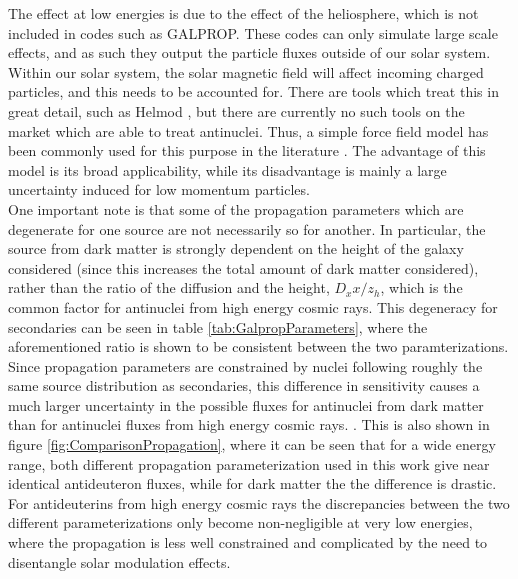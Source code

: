 The effect at low energies is due to the effect of the heliosphere, which is not included in codes such as GALPROP. These codes can only simulate large scale effects, and as such they output the particle fluxes outside of our solar system. Within our solar system, the solar magnetic field will affect incoming charged particles, and this needs to be accounted for. There are tools which treat this in great detail, such as Helmod \cite{}, but there are currently no such tools on the market which are able to treat antinuclei. Thus, a simple force field model has been commonly used for this purpose in the literature \cite{}. The advantage of this model is its broad applicability, while its disadvantage is mainly a large uncertainty induced for low momentum particles\cite{}. \\

One important note is that some of the propagation parameters which are degenerate for one source are not necessarily so for another. In particular, the source from dark matter is strongly dependent on the height of the galaxy considered (since this increases the total amount of dark matter considered), rather than the ratio of the diffusion and the height, $D_xx/z_h$, which is the common factor for antinuclei from high energy cosmic rays. This degeneracy for secondaries can be seen in table \ref{tab:GalpropParameters}, where the aforementioned  ratio is shown to be consistent between the two paramterizations. Since propagation parameters are constrained by nuclei following roughly the same source distribution as secondaries, this difference in sensitivity causes a much larger uncertainty in the possible fluxes for antinuclei from dark matter than for antinuclei fluxes from high energy cosmic rays. \cite{}. This is also shown in figure \ref{fig:ComparisonPropagation}, where it can be seen that for a wide energy range, both different propagation parameterization used in this work give near identical antideuteron fluxes, while for dark matter the the difference is drastic. For antideuterins from high energy cosmic rays the discrepancies between the two different parameterizations only become non-negligible at very low energies, where the propagation is less well constrained and complicated by the need to disentangle solar modulation effects. 

